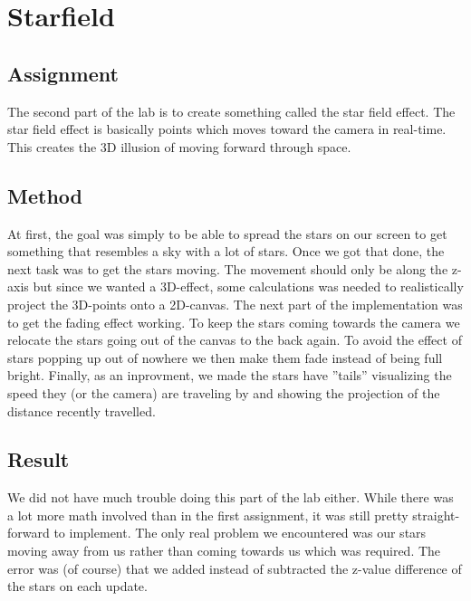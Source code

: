\documentclass[a4paper,11pt]{article}
\begin{document}
\clearpage
\section{Starfield}
\subsection{Assignment}
The second part of the lab is to create something called the star field effect. The star field effect is basically points which moves toward the camera in real-time. This creates the 3D illusion of moving forward through space.
\subsection{Method}
At first, the goal was simply to be able to spread the stars on our screen to get something that resembles a sky with a lot of stars. Once we got that done, the next task was to get the stars moving. The movement should only be along the z-axis but since we wanted a 3D-effect, some calculations was needed to realistically project the 3D-points onto a 2D-canvas. The next part of the implementation was to get the fading effect working. To keep the stars coming towards the camera we relocate the stars going out of the canvas to the back again. To avoid the effect of stars popping up out of nowhere we then make them fade instead of being full bright. Finally, as an inprovment, we made the stars have ''tails'' visualizing the speed they (or the camera) are traveling by and showing the projection of the distance recently travelled. 

\subsection{Result}
We did not have much trouble doing this part of the lab either. While there was a lot more math involved than in the first assignment, it was still pretty straight-forward to implement. The only real problem we encountered was our stars moving away from us rather than coming towards us which was required. The error was (of course) that we added instead of subtracted the z-value difference of the stars on each update.
\end{document}
